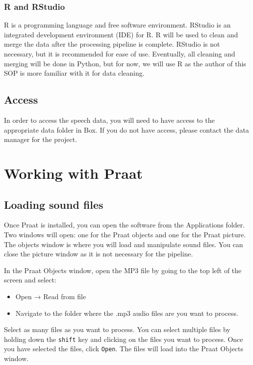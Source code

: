 \documentclass[
]{book}
\begin{document}
\subsection{R and RStudio}\label{r-and-rstudio}

R is a programming language and free software environment. RStudio is an integrated development environment (IDE) for R. R will be used to clean and merge the data after the processing pipeline is complete. RStudio is not necessary, but it is recommended for ease of use. Eventually, all cleaning and merging will be done in Python, but for now, we will use R as the author of this SOP is more familiar with it for data cleaning.

\section{Access}\label{access}

In order to access the speech data, you will need to have access to the appropriate data folder in Box. If you do not have access, please contact the data manager for the project.

\chapter{Working with Praat}\label{working-with-praat}

\section{Loading sound files}\label{loading-sound-files}

Once Praat is installed, you can open the software from the Applications folder. Two windows will open: one for the Praat objects and one for the Praat picture. The objects window is where you will load and manipulate sound files. You can close the picture window as it is not necessary for the pipeline.

In the Praat Objects window, open the MP3 file by going to the top left of the screen and select:

\begin{itemize}
\item
  Open → Read from file
\item
  Navigate to the folder where the .mp3 audio files are you want to process.
\end{itemize}

Select as many files as you want to process. You can select multiple files by holding down the \texttt{shift} key and clicking on the files you want to process. Once you have selected the files, click \texttt{Open}. The files will load into the Praat Objects window.
\end{document}
